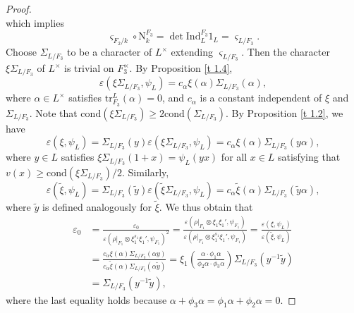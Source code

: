 \documentclass[12pt]{amsart}
\newcommand{\tr}{{\mathrm{tr}}}
\theoremstyle{Theorem}
\theoremstyle{Theorem}
\theoremstyle{Theorem}
\theoremstyle{Theorem}
\theoremstyle{Plain}
\theoremstyle{remark}
\theoremstyle{remark}
\theoremstyle{Definition}
\begin{document}
\begin{proof}
\[    \]
    which implies
    \[
        \varsigma_{ F_2/k } \circ \mathrm{N}^{ F_3 }_k = \det \mathrm{Ind}_{L}^{ F_3 } 1_L = \varsigma_{ L/F_3 }.
    \]
    Choose $ \Sigma_{ L/F_3 } $ to be a character of $L^\times$ extending $ \varsigma_{ L/F_3 } $. Then the character $ \xi \Sigma_{ L/F_3 } $ of $L^\times$ is trivial on $F_3^\times$. By Proposition \ref{t 1.4},
    \[
        \varepsilon \left( \xi \Sigma_{ L/F_3 }, \psi_L \right) = c_{ \alpha } \xi( \alpha ) \Sigma_{ L/F_3 } ( \alpha ),
    \]
    where $ \alpha \in L^\times $ satisfies $ \tr^L_{ F_3 } ( \alpha ) = 0 $, and $c_{\alpha}$ is a constant independent of $\xi$ and $ \Sigma_{ L/F_3 } $. Note that $ \mathrm{cond} \left( \xi \Sigma_{ L/{F_3} } \right) \ge 2 \mathrm{cond} \left( \Sigma_{ L/F_3 } \right) $. By Proposition \ref{t 1.2}, we have
    \[
        \varepsilon \left( \xi, \psi_L \right) = \Sigma_{ L/F_3 }(y) \varepsilon \left( \xi \Sigma_{ L/F_3 }, \psi_L \right) = c_{\alpha} \xi ( \alpha ) \Sigma_{ L/F_3 } ( y \alpha ),
    \]
    where $ y\in L $ satisfies $ \xi \Sigma_{ L/F_3 }(1 + x) = \psi_L( yx )$ for all $ x \in L $ satisfying that $ v(x) \ge \mathrm{cond} \left( \xi \Sigma_{ L/F_3 } \right) / 2 $. Similarly,
    \[
        \varepsilon \left( \widetilde{ \xi }, \psi_L \right) = \Sigma_{ L/F_3 } \left( \widetilde{y} \right) \varepsilon \left( \widetilde{ \xi } \Sigma_{ L/F_3 }, \psi_L \right) = c_\alpha \widetilde{ \xi }( \alpha ) \Sigma_{ L/F_3 } \left( \widetilde{y} \alpha \right),
    \]
    where $ \widetilde{y} $ is defined analogously for $ \widetilde{ \xi } $. We thus obtain that
    \[
        \begin{aligned}
            \varepsilon_0 &= \frac{ \varepsilon_0 }{ \varepsilon \left( \rho|_{ F_1 } \otimes \xi_1^{ s_1 } \xi_1', \psi_{ F_1 } \right)^2 } = \frac{ \varepsilon \left( \rho|_{ F_1 } \otimes \xi_1 \xi_1', \psi_{ F_1 } \right) }{ \varepsilon \left( \rho|_{ F_1 } \otimes \xi_1^{ s_1 } \xi_1', \psi_{ F_1 } \right)} = \frac{ \varepsilon \left( \xi, \psi_L \right) }{ \varepsilon \left( \widetilde{ \xi }, \psi_L \right) }\\
                          &= \frac {c_\alpha \xi ( \alpha ) \Sigma_{ L/F_3 } ( \alpha y )}{ c_{\alpha} \widetilde{ \xi } ( \alpha ) \Sigma_{ L/F_3 } ( \alpha \widetilde{y} ) } = \xi_1 \left( \frac{ \alpha \cdot \phi_1 \alpha }{ \phi_2 \alpha \cdot \phi_3 \alpha } \right) \Sigma_{ L/F_3 }( y^{-1} \widetilde{y} )                                                \\
                          &= \Sigma_{ L/F_3 } ( y^{-1} \widetilde{y} ),
        \end{aligned}
    \]
    where the last equality holds because $\alpha+\phi_3\alpha=\phi_1\alpha+\phi_2\alpha=0$.
\end{proof}
\end{document}
